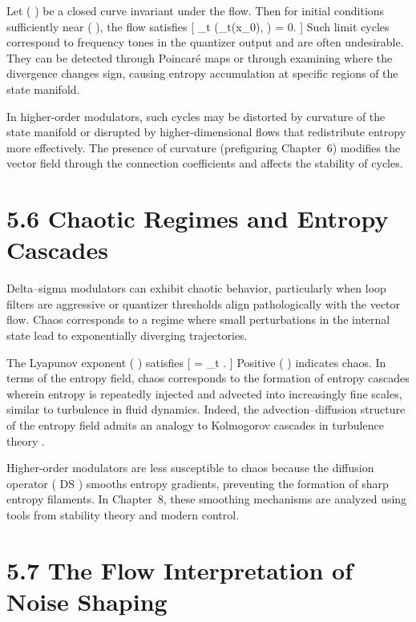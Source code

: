 Let ( \Gamma \subset {} ) be a closed curve invariant under the flow. Then for initial conditions sufficiently near ( \Gamma ), the flow satisfies
[
\lim_{t\to\infty} (\phi_t(x_0), \Gamma) = 0.
]
Such limit cycles correspond to frequency tones in the quantizer output and are often undesirable. They can be detected through Poincaré maps or through examining where the divergence changes sign, causing entropy accumulation at specific regions of the state manifold.

In higher-order modulators, such cycles may be distorted by curvature of the state manifold or disrupted by higher-dimensional flows that redistribute entropy more effectively. The presence of curvature (prefiguring Chapter~6) modifies the vector field through the connection coefficients and affects the stability of cycles.

\section*{5.6 Chaotic Regimes and Entropy Cascades}

Delta–sigma modulators can exhibit chaotic behavior, particularly when loop filters are aggressive or quantizer thresholds align pathologically with the vector flow. Chaos corresponds to a regime where small perturbations in the internal state lead to exponentially diverging trajectories.

The Lyapunov exponent ( \lambda ) satisfies
[
\lambda = \lim_{t\to\infty}  \log {}.
]
Positive ( \lambda ) indicates chaos. In terms of the entropy field, chaos corresponds to the formation of entropy cascades wherein entropy is repeatedly injected and advected into increasingly fine scales, similar to turbulence in fluid dynamics. Indeed, the advection–diffusion structure of the entropy field admits an analogy to Kolmogorov cascades in turbulence theory \citep{frisch1995turbulence}.

Higher-order modulators are less susceptible to chaos because the diffusion operator ( D\Delta S ) smooths entropy gradients, preventing the formation of sharp entropy filaments. In Chapter~8, these smoothing mechanisms are analyzed using tools from stability theory and modern control.

\section*{5.7 The Flow Interpretation of Noise Shaping}

